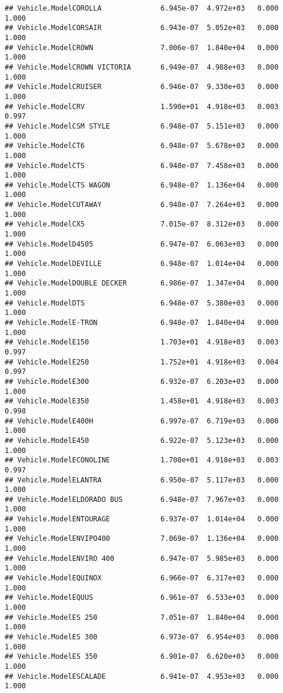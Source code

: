 \documentclass[
]{article}
\begin{document}
\begin{verbatim}
## Vehicle.ModelCOROLLA              6.945e-07  4.972e+03   0.000    1.000
## Vehicle.ModelCORSAIR              6.943e-07  5.052e+03   0.000    1.000
## Vehicle.ModelCROWN                7.006e-07  1.840e+04   0.000    1.000
## Vehicle.ModelCROWN VICTORIA       6.949e-07  4.988e+03   0.000    1.000
## Vehicle.ModelCRUISER              6.946e-07  9.330e+03   0.000    1.000
## Vehicle.ModelCRV                  1.590e+01  4.918e+03   0.003    0.997
## Vehicle.ModelCSM STYLE            6.948e-07  5.151e+03   0.000    1.000
## Vehicle.ModelCT6                  6.948e-07  5.678e+03   0.000    1.000
## Vehicle.ModelCTS                  6.948e-07  7.458e+03   0.000    1.000
## Vehicle.ModelCTS WAGON            6.948e-07  1.136e+04   0.000    1.000
## Vehicle.ModelCUTAWAY              6.948e-07  7.264e+03   0.000    1.000
## Vehicle.ModelCX5                  7.015e-07  8.312e+03   0.000    1.000
## Vehicle.ModelD4505                6.947e-07  6.063e+03   0.000    1.000
## Vehicle.ModelDEVILLE              6.948e-07  1.014e+04   0.000    1.000
## Vehicle.ModelDOUBLE DECKER        6.986e-07  1.347e+04   0.000    1.000
## Vehicle.ModelDTS                  6.948e-07  5.380e+03   0.000    1.000
## Vehicle.ModelE-TRON               6.948e-07  1.840e+04   0.000    1.000
## Vehicle.ModelE150                 1.703e+01  4.918e+03   0.003    0.997
## Vehicle.ModelE250                 1.752e+01  4.918e+03   0.004    0.997
## Vehicle.ModelE300                 6.932e-07  6.203e+03   0.000    1.000
## Vehicle.ModelE350                 1.458e+01  4.918e+03   0.003    0.998
## Vehicle.ModelE400H                6.997e-07  6.719e+03   0.000    1.000
## Vehicle.ModelE450                 6.922e-07  5.123e+03   0.000    1.000
## Vehicle.ModelECONOLINE            1.708e+01  4.918e+03   0.003    0.997
## Vehicle.ModelELANTRA              6.950e-07  5.117e+03   0.000    1.000
## Vehicle.ModelELDORADO BUS         6.948e-07  7.967e+03   0.000    1.000
## Vehicle.ModelENTOURAGE            6.937e-07  1.014e+04   0.000    1.000
## Vehicle.ModelENVIPO400            7.069e-07  1.136e+04   0.000    1.000
## Vehicle.ModelENVIRO 400           6.947e-07  5.985e+03   0.000    1.000
## Vehicle.ModelEQUINOX              6.966e-07  6.317e+03   0.000    1.000
## Vehicle.ModelEQUUS                6.961e-07  6.533e+03   0.000    1.000
## Vehicle.ModelES 250               7.051e-07  1.840e+04   0.000    1.000
## Vehicle.ModelES 300               6.973e-07  6.954e+03   0.000    1.000
## Vehicle.ModelES 350               6.901e-07  6.620e+03   0.000    1.000
## Vehicle.ModelESCALADE             6.941e-07  4.953e+03   0.000    1.000

\end{verbatim}
\end{document}
